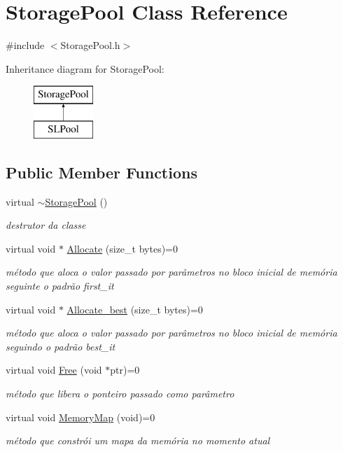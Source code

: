 \hypertarget{class_storage_pool}{}\section{Storage\+Pool Class Reference}
\label{class_storage_pool}


{\ttfamily \#include $<$Storage\+Pool.\+h$>$}

Inheritance diagram for Storage\+Pool\+:\begin{figure}[H]
\begin{center}
\leavevmode
\includegraphics[height=2.000000cm]{class_storage_pool}
\end{center}
\end{figure}
\subsection*{Public Member Functions}
\begin{DoxyCompactItemize}
\item 
virtual \hyperlink{class_storage_pool_af762401e53c754fccb49703579bd3b31}{$\sim$\+Storage\+Pool} ()
\begin{DoxyCompactList}\small\item\em destrutor da classe \end{DoxyCompactList}\item 
virtual void $\ast$ \hyperlink{class_storage_pool_a5de4eb49eafbf2adb86eb7e66739c947}{Allocate} (size\+\_\+t bytes)=0
\begin{DoxyCompactList}\small\item\em método que aloca o valor passado por parâmetros no bloco inicial de memória seguinte o padrão first\+\_\+it \end{DoxyCompactList}\item 
virtual void $\ast$ \hyperlink{class_storage_pool_a9224f3fabf7ad7f5b80dd829ac30c69f}{Allocate\+\_\+best} (size\+\_\+t bytes)=0
\begin{DoxyCompactList}\small\item\em método que aloca o valor passado por parâmetros no bloco inicial de memória seguindo o padrão best\+\_\+it \end{DoxyCompactList}\item 
virtual void \hyperlink{class_storage_pool_a783b53d1799425318d9d4c3d5d90ac7c}{Free} (void $\ast$ptr)=0
\begin{DoxyCompactList}\small\item\em método que libera o ponteiro passado como parâmetro \end{DoxyCompactList}\item 
virtual void \hyperlink{class_storage_pool_aa30940ace73f59c81571feb4234abc1a}{Memory\+Map} (void)=0
\begin{DoxyCompactList}\small\item\em método que constrói um mapa da memória no momento atual \end{DoxyCompactList}\end{DoxyCompactItemize}


